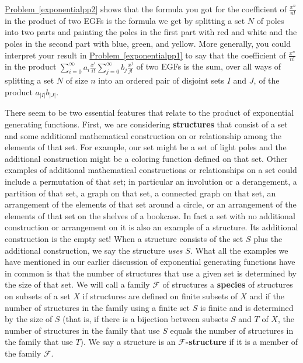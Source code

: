\documentclass[10pt,]{book}
\newcommand{\terminology}[1]{\textbf{#1}}
\theoremstyle{plain}
\theoremstyle{definition}
\theoremstyle{definition}
\numberwithin{equation}{chapter}
\newcommand{\F}{\mathcal{F}}
\begin{document}
\hyperref[exponentialpp2]{Problem~\ref{exponentialpp2}} shows that the formula you got for the coefficient of \(\frac{x^n}{n!}\) in the product of two EGFs is the formula we get by splitting a set \(N\) of poles into two parts and painting the poles in the first part with red and white and the poles in the second part with blue, green, and yellow.  More generally, you could interpret your result in \hyperref[exponentialpp1]{Problem~\ref{exponentialpp1}} to say that the coefficient of \(\frac{x^n}{n!}\) in the product \(\sum_{i=0}^\infty a_i \frac{x^i}{i!}
\sum_{j=0}^\infty b_j\frac{x^j}{j!}\) of two EGFs is the sum, over all ways of splitting a set \(N\) of size \(n\) into an ordered pair of disjoint sets \(I\) and \(J\), of the product \(a_{|I|}b_{|J|}\).%
\par
There seem to be two essential features that relate to the product of exponential generating functions. First, we are considering \terminology{structures} that consist of a set and some additional mathematical construction on or relationship among the elements of that set. For example, our set might be a set of light poles and the additional construction might be a coloring function defined on that set. Other examples of additional mathematical constructions or relationships on a set could include a permutation of that set; in particular an involution or a derangement, a partition of that set, a graph on that set, a connected graph on that set, an arrangement of the elements of that set around a circle, or an arrangement of the elements of that set on the shelves of a bookcase. In fact a set with no additional construction or arrangement on it is also an example of a structure. Its additional construction is the empty set!  When a structure consists of the set \(S\) plus the additional construction, we say the structure \emph{uses} \(S\). What all the examples we have mentioned in our earlier discussion of exponential generating functions have in common is that the number of structures that use a given set is determined by the size of that set. We will call a family \(\F\) of structures a \terminology{species} of structures on subsets of a set \(X\) if structures are defined on finite subsets of \(X\) and if the number of structures in the family using a finite set \(S\) is finite and is determined by the size of \(S\) (that is, if there is a bijection between subsets \(S\) and \(T\) of \(X\), the number of structures in the family that use \(S\) equals the number of structures in the family that use \(T\)). We say a structure is an \terminology{\(\F\)-structure} if it is a member of the family \(\F\).%
\end{document}
